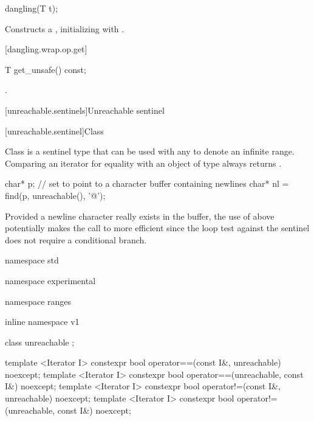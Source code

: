 %
\begin{itemdecl}
dangling(T t);
\end{itemdecl}

\begin{itemdescr}
\pnum
\effects Constructs a , initializing  with .
\end{itemdescr}

[dangling.wrap.op.get]{}

%
%
\begin{itemdecl}
T get_unsafe() const;
\end{itemdecl}

\begin{itemdescr}
\pnum
\returns {}.
\end{itemdescr}

[unreachable.sentinels]{Unreachable sentinel}

[unreachable.sentinel]{Class }

\pnum
{}%
Class  is a sentinel type that can be used with any
 to denote an infinite range. Comparing an iterator for equality with
an object of type  always returns .

\enterexample
\begin{codeblock}
char* p;
// set  to point to a character buffer containing newlines
char* nl = find(p, unreachable(), '@\textbackslash@n');
\end{codeblock}

Provided a newline character really exists in the buffer, the use of 
above potentially makes the call to  more efficient since the loop test against
the sentinel does not require a conditional branch.
\exitexample

\begin{codeblock}
namespace std { namespace experimental { namespace ranges { inline namespace v1 {
  class unreachable { };

  template <Iterator I>
    constexpr bool operator==(const I&, unreachable) noexcept;
  template <Iterator I>
    constexpr bool operator==(unreachable, const I&) noexcept;
  template <Iterator I>
    constexpr bool operator!=(const I&, unreachable) noexcept;
  template <Iterator I>
    constexpr bool operator!=(unreachable, const I&) noexcept;
}}}}
\end{codeblock}

